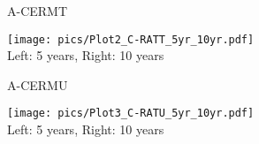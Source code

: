\documentclass{beamer}
\begin{document}
\begin{frame}{A-CERMT}
   
    \texttt{[image: pics/Plot2\_C-RATT\_5yr\_10yr.pdf]} \\
     Left: 5 years, Right: 10 years
\end{frame}

\begin{frame}{A-CERMU}
   
    \texttt{[image: pics/Plot3\_C-RATU\_5yr\_10yr.pdf]} \\
     Left: 5 years, Right: 10 years
\end{frame}








\end{document}
